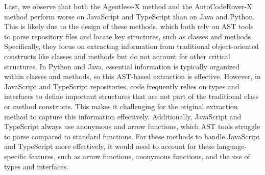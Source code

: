 Last, we observe that both the Agentless-X method and the AutoCodeRover-X method perform worse on JavaScript and TypeScript than on Java and Python. This is likely due to the design of these methods, which both rely on AST tools to parse repository files and locate key structures, such as classes and methods. Specifically, they focus on extracting information from traditional object-oriented constructs like classes and methods but do not account for other critical structures.  In Python and Java, essential information is typically organized within classes and methods, so this AST-based extraction is effective. However, in JavaScript and TypeScript repositories, code frequently relies on types and interfaces to define important structures that are not part of the traditional class or method constructs. This makes it challenging for the original extraction method to capture this information effectively. Additionally, JavaScript and TypeScript always use anonymous and arrow functions, which AST tools struggle to parse compared to standard functions. For these methods to handle JavaScript and TypeScript more effectively, it would need to account for these language-specific features, such as arrow functions, anonymous functions, and the use of types and interfaces.




